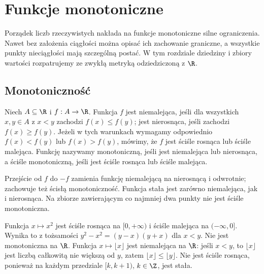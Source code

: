 \chapter{Funkcje monotoniczne}
\label{ma1:ch:monotone-functions}

Porządek liczb rzeczywistych nakłada na funkcje monotoniczne silne ograniczenia. Nawet bez założenia ciągłości można opisać ich zachowanie graniczne, a wszystkie punkty nieciągłości mają szczególną postać. W tym rozdziale dziedziny i zbiory wartości rozpatrujemy ze zwykłą metryką odziedziczoną z $\R$.

\section{Monotoniczność}
\begin{definicja}
\label{ma1:def:monotone-function}
Niech $A\subseteq\R$ i $f:A\to\R$. Funkcja $f$ jest niemalejąca, jeśli dla wszystkich $x,y\in A$ z $x<y$ zachodzi $f(x)\le f(y)$; jest nierosnąca, jeśli zachodzi $f(x)\ge f(y)$. Jeżeli w tych warunkach wymagamy odpowiednio $f(x)<f(y)$ lub $f(x)>f(y)$, mówimy, że $f$ jest ściśle rosnąca lub ściśle malejąca. Funkcję nazywamy monotoniczną, jeśli jest niemalejąca lub nierosnąca, a ściśle monotoniczną, jeśli jest ściśle rosnąca lub ściśle malejąca.
\end{definicja}
Przejście od $f$ do $-f$ zamienia funkcję niemalejącą na nierosnącą i odwrotnie; zachowuje też ścisłą monotoniczność. Funkcja stała jest zarówno niemalejąca, jak i nierosnąca. Na zbiorze zawierającym co najmniej dwa punkty nie jest ściśle monotoniczna.

\begin{przyklad}
\label{ma1:ex:monotone-basic}
Funkcja $x\mapsto x^2$ jest ściśle rosnąca na $[0,+\infty)$ i ściśle malejąca na $(-\infty,0]$. Wynika to z tożsamości $y^2-x^2=(y-x)(y+x)$ dla $x<y$. Nie jest monotoniczna na $\R$. Funkcja $x\mapsto\lfloor x\rfloor$ jest niemalejąca na $\R$: jeśli $x<y$, to $\lfloor x\rfloor$ jest liczbą całkowitą nie większą od $y$, zatem $\lfloor x\rfloor\le\lfloor y\rfloor$. Nie jest ściśle rosnąca, ponieważ na każdym przedziale $[k,k+1)$, $k\in\Z$, jest stała.
\end{przyklad}

